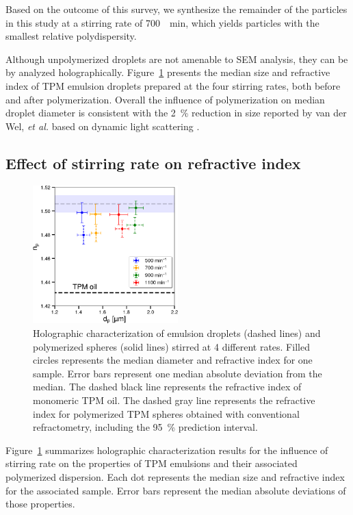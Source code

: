 \documentclass[journal=langd5,manuscript=article]{achemso}
\begin{document}
Based on the outcome of this survey, we synthesize
the remainder of the particles in this study
at a stirring rate of \SI{700}{\per\minute},
which yields particles with the smallest
relative polydispersity.

Although unpolymerized droplets are not amenable to SEM analysis,
they can be by analyzed holographically.
Figure~\ref{fig:jointspeed} presents the median size and refractive index
of TPM emulsion droplets prepared at the four stirring rates,
both before and after polymerization.
Overall the influence of polymerization on median droplet diameter is
consistent with the \SI{2}{\percent} reduction in size reported by
van der Wel, \emph{et al.}
based on dynamic light scattering \cite{vanderwel17}.

\subsection{Effect of stirring rate on refractive index}
\label{sec:stirindex}

\begin{figure}
  \centering
  \includegraphics[width=0.5\textwidth]{jointspeed}
  \caption{Holographic characterization of emulsion droplets
    (dashed lines) and polymerized spheres (solid lines)
    stirred at \num{4} different rates.
    Filled circles represents the median diameter and refractive index
    for one sample.  Error bars represent one median absolute 
    deviation from the median.
    The dashed black line represents the refractive index of monomeric
    TPM oil.
    The dashed gray line represents the refractive index for polymerized
    TPM spheres obtained with conventional refractometry, including
    the \SI{95}{\percent} prediction interval.}
  \label{fig:jointspeed}
\end{figure}

Figure~\ref{fig:jointspeed} summarizes holographic characterization
results for the influence of stirring rate on the properties of TPM
emulsions and their associated polymerized dispersion.
Each dot represents the median size and refractive index for the associated sample.
Error bars represent the median absolute deviations of those properties.
\end{document}
